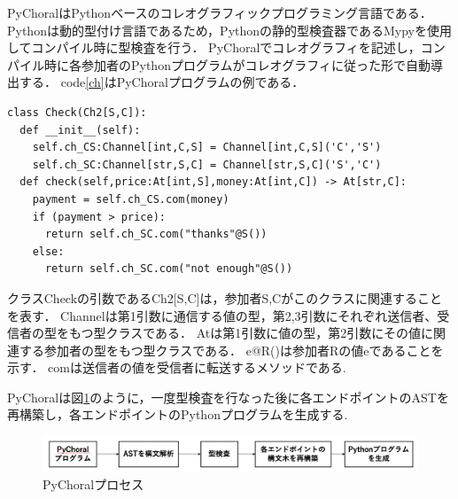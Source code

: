 \documentclass{resume}
\begin{document}
PyChoralはPythonベースのコレオグラフィックプログラミング言語である．
Pythonは動的型付け言語であるため，Pythonの静的型検査器であるMypyを使用してコンパイル時に型検査を行う．
PyChoralでコレオグラフィを記述し，コンパイル時に各参加者のPythonプログラムがコレオグラフィに従った形で自動導出する．
code\ref{ch}はPyChoralプログラムの例である．
\vspace{-10pt}
\begin{lstlisting}[caption=Staff(S)とCustomer(C)でのお会計時のやり取り,label=ch]
class Check(Ch2[S,C]):
  def __init__(self):
    self.ch_CS:Channel[int,C,S] = Channel[int,C,S]('C','S')
    self.ch_SC:Channel[str,S,C] = Channel[str,S,C]('S','C')
  def check(self,price:At[int,S],money:At[int,C]) -> At[str,C]:
    payment = self.ch_CS.com(money)
    if (payment > price):
      return self.ch_SC.com("thanks"@S())
    else:
      return self.ch_SC.com("not enough"@S())
\end{lstlisting}
クラス\textsf{Check}の引数である\textsf{Ch2[S,C]}は，参加者S,Cがこのクラスに関連することを表す．
\textsf{Channel}は第1引数に通信する値の型，第2,3引数にそれぞれ送信者、受信者の型をもつ型クラスである．
\textsf{At}は第1引数に値の型，第2引数にその値に関連する参加者の型をもつ型クラスである．
\textsf{e@R()}は参加者Rの値eであることを示す．
\textsf{com}は送信者の値を受信者に転送するメソッドである.%

PyChoralは図\ref{pychoralprocess}のように，一度型検査を行なった後に各エンドポイントのASTを再構築し，各エンドポイントのPythonプログラムを生成する.
\vspace{-7pt}
\begin{figure}[H]
  \centering
  \includegraphics[scale=0.23]{image/pychoralprocess.png}
  \caption{PyChoralプロセス}
  \label{pychoralprocess}
\end{figure}
\vspace{-17pt}
\end{document}
